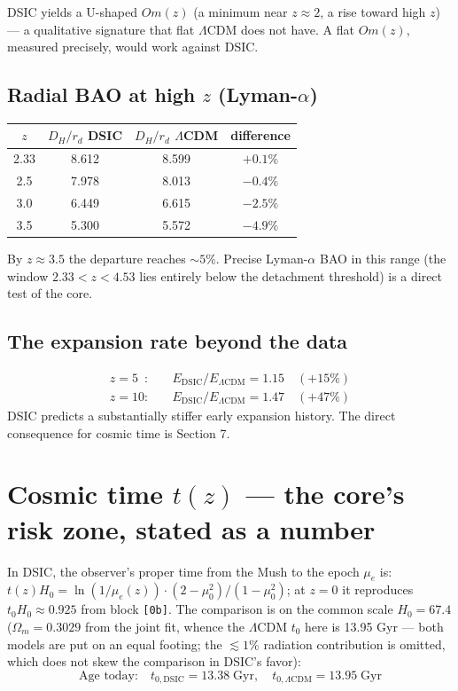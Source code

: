 \documentclass[a4paper,10pt]{article}
\begin{document}
DSIC yields a U-shaped $Om(z)$ (a minimum near $z \approx 2$, a rise toward high $z$) --- a qualitative signature that flat $\Lambda$CDM does not have. A flat $Om(z)$, measured precisely, would work against DSIC.

\subsection{Radial BAO at high $z$ (Lyman-$\alpha$)}

\begin{table}[htbp]
\centering
\small
\begin{tabular}{@{}cccc@{}}
\toprule
$z$ & $D_H/r_d$ DSIC & $D_H/r_d$ $\Lambda$CDM & difference \\
\midrule
2.33 & 8.612 & 8.599 & $+0.1\%$ \\
2.5 & 7.978 & 8.013 & $-0.4\%$ \\
3.0 & 6.449 & 6.615 & $-2.5\%$ \\
3.5 & 5.300 & 5.572 & $-4.9\%$ \\
\bottomrule
\end{tabular}
\end{table}

By $z \approx 3.5$ the departure reaches ${\sim}5\%$. Precise Lyman-$\alpha$ BAO in this range (the window $2.33 < z < 4.53$ lies entirely below the detachment threshold) is a direct test of the core.

\subsection{The expansion rate beyond the data}

\begin{align*}
z = 5\phantom{0}: &\quad E_{\text{DSIC}} / E_{\Lambda\text{CDM}} = 1.15 \quad (+15\%) \\
z = 10: &\quad E_{\text{DSIC}} / E_{\Lambda\text{CDM}} = 1.47 \quad (+47\%)
\end{align*}
DSIC predicts a substantially stiffer early expansion history. The direct consequence for cosmic time is Section 7.

\section{Cosmic time $t(z)$ --- the core's risk zone, stated as a number}

In DSIC, the observer's proper time from the Mush to the epoch $\mu_e$ is: $t(z) H_0 = \ln(1/\mu_e(z))\cdot(2-\mu_0^2)/(1-\mu_0^2)$; at $z = 0$ it reproduces $t_0 H_0 \approx 0.925$ from block \texttt{[0b]}. The comparison is on the common scale $H_0 = 67.4$ ($\Omega_m = 0.3029$ from the joint fit, whence the $\Lambda$CDM $t_0$ here is 13.95 Gyr --- both models are put on an equal footing; the ${\lesssim}1\%$ radiation contribution is omitted, which does not skew the comparison in DSIC's favor):
\begin{equation*}
\text{Age today:}\quad t_{0,\text{DSIC}} = 13.38\;\text{Gyr},\quad t_{0,\Lambda\text{CDM}} = 13.95\;\text{Gyr}
\end{equation*}
\end{document}
